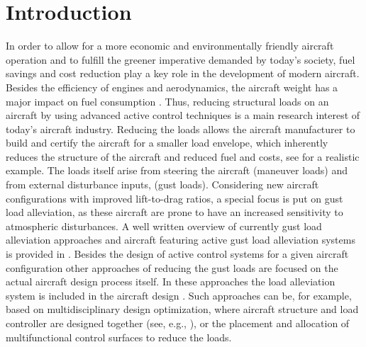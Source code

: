 \documentclass[graybox]{svmult}
\begin{document}
\section{Introduction}

In order to allow for a more economic and environmentally friendly aircraft operation and to fulfill the greener imperative demanded by today's society, fuel savings and cost reduction play a key role in the development of modern aircraft. Besides the efficiency of engines and aerodynamics, the aircraft weight has a major impact on fuel consumption \cite{IEA2009}. 
Thus, reducing structural loads on an aircraft by using advanced active control techniques is a main research interest of today's aircraft industry. Reducing the loads allows the aircraft manufacturer to build and certify \cite{FAA15} the aircraft for a smaller load envelope, which inherently reduces the structure of the aircraft and reduced fuel and costs, see \cite{Johnston79} for a realistic example.
The loads itself arise from steering the aircraft (maneuver loads) and from external disturbance inputs, (gust loads). Considering new
aircraft configurations with improved lift-to-drag ratios, a special focus is put on gust load alleviation, as these aircraft are prone to have an increased sensitivity to atmospheric disturbances. A well written overview of currently gust load alleviation approaches and aircraft featuring  active gust load alleviation systems is provided in \cite{Regan12}.
Besides the design of  active control systems for a given aircraft configuration other approaches of reducing the gust loads are focused on the actual aircraft design process itself. In these approaches the load alleviation system is included in the aircraft design \cite{Livne99}. Such approaches can be, for example, based on  multidisciplinary design optimization, where aircraft structure and load controller are designed together (see, e.g., \cite{Xu14}), or the  placement \cite{Pusch2015} and allocation \cite{Pusch2017} of multifunctional control surfaces to reduce the loads.
\end{document}
